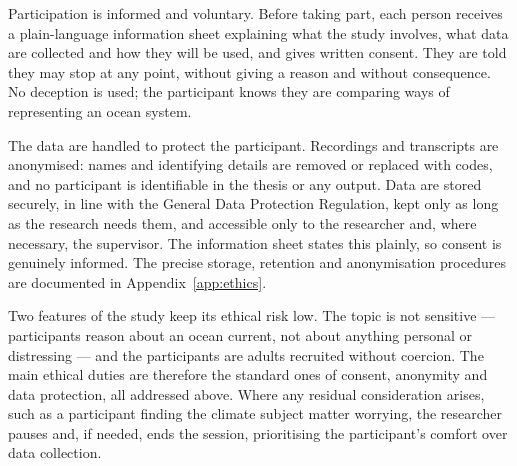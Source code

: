 Participation is informed and voluntary. Before taking part, each person receives a plain-language information sheet explaining what the study involves, what data are collected and how they will be used, and gives written consent. They are told they may stop at any point, without giving a reason and without consequence. No deception is used; the participant knows they are comparing ways of representing an ocean system.
 
The data are handled to protect the participant. Recordings and transcripts are anonymised: names and identifying details are removed or replaced with codes, and no participant is identifiable in the thesis or any output. Data are stored securely, in line with the General Data Protection Regulation, kept only as long as the research needs them, and accessible only to the researcher and, where necessary, the supervisor. The information sheet states this plainly, so consent is genuinely informed. The precise storage, retention and anonymisation procedures are documented in Appendix~\ref{app:ethics}.
 
Two features of the study keep its ethical risk low. The topic is not sensitive --- participants reason about an ocean current, not about anything personal or distressing --- and the participants are adults recruited without coercion. The main ethical duties are therefore the standard ones of consent, anonymity and data protection, all addressed above. Where any residual consideration arises, such as a participant finding the climate subject matter worrying, the researcher pauses and, if needed, ends the session, prioritising the participant's comfort over data collection.